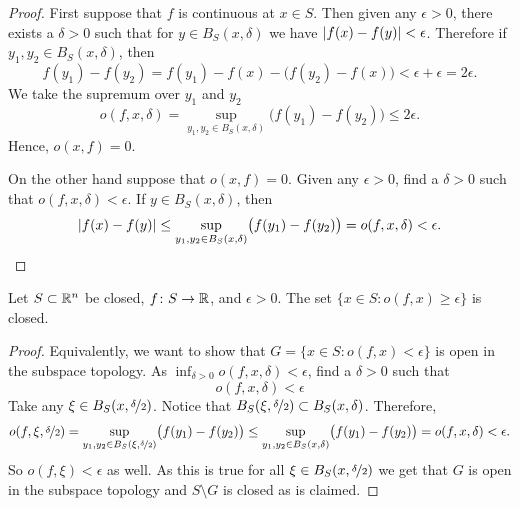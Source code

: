\begin{proof}
First suppose that $f$ is continuous at $x \in S$.  Then given any $\epsilon > 0$,
there exists a $\delta > 0$ such that for $y \in B_S(x,\delta)$
we have $\lvert {f(x)-f(y)} \rvert < \epsilon$.  Therefore if $y_1,y_2 \in
B_S(x,\delta)$, then
\begin{equation*}
f(y_1)-f(y_2) =
f(y_1)-f(x)-\bigl(f(y_2)-f(x)\bigr) < \epsilon + \epsilon = 2 \epsilon .
\end{equation*}
We take the supremum over $y_1$ and $y_2$
\begin{equation*}
o(f,x,\delta) = 
\sup_{y_1,y_2 \in B_S(x,\delta)} \bigl(f(y_1)-f(y_2)\bigr)
\leq
2 \epsilon .
\end{equation*}
Hence, $o(x,f) = 0$.

On the other hand suppose that $o(x,f) = 0$.  Given any $\epsilon > 0$,
find a $\delta > 0$ such that $o(f,x,\delta) < \epsilon$.  If
$y \in B_S(x,\delta)$, then
\begin{equation*}
\lvert {f(x)-f(y)} \rvert
\leq
\sup_{y_1,y_2 \in B_S(x,\delta)} \bigl(f(y_1)-f(y_2)\bigr)
=
o(f,x,\delta) < \epsilon. \qedhere
\end{equation*}
\end{proof}

\begin{prop} \label{prop:seclosed}
Let $S \subset {\mathbb{R}}^n$ be closed,
$f \colon S \to {\mathbb{R}}$, and $\epsilon > 0$.
The set $\{ x \in S : o(f,x) \geq \epsilon \}$ is closed.
\end{prop}

\begin{proof}
Equivalently, we want to show that
$G = \{ x \in S : o(f,x) < \epsilon \}$ is open in the subspace topology.
As $\inf_{\delta > 0} o(f,x,\delta) < \epsilon$, find a $\delta > 0$ such
that
\begin{equation*}
o(f,x,\delta) < \epsilon
\end{equation*}
Take any $\xi \in B_S(x,\nicefrac{\delta}{2})$.  Notice that
$B_S(\xi,\nicefrac{\delta}{2}) \subset B_S(x,\delta)$.  Therefore,
\begin{equation*}
o(f,\xi,\nicefrac{\delta}{2}) =
\sup_{y_1,y_2 \in B_S(\xi,\nicefrac{\delta}{2})} \bigl(f(y_1)-f(y_2)\bigr) 
\leq
\sup_{y_1,y_2 \in B_S(x,\delta)} \bigl(f(y_1)-f(y_2)\bigr) = o(f,x,\delta) <
\epsilon .
\end{equation*}
So $o(f,\xi) < \epsilon$ as well.  As this is true for all $\xi \in
B_S(x,\nicefrac{\delta}{2})$ we get that $G$ is open in the subspace
topology and $S \setminus G$ is closed as is claimed.
\end{proof}


